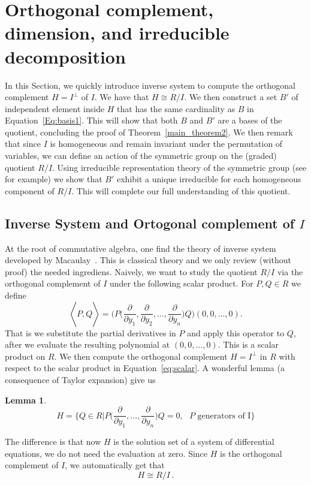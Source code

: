 \documentclass[12pt,reqno]{amsart}
\theoremstyle{plain}
\newtheorem{lemma}[theorem]{Lemma}
\theoremstyle{definition}
\DeclareMathOperator{\la}{\langle}
\DeclareMathOperator{\ra}{\rangle}
\begin{document}
\section{Orthogonal complement, dimension, and irreducible decomposition}\label{sec:irreducible}
In this Section, we quickly introduce inverse system to compute the orthogonal complement $H=I^\perp$ of $I$.
We have that $H\cong R/I$.
We then construct a set $B'$ of independent element inside  $H$ that has the same cardinality as $B$ in Equation~\eqref{Eq:basis1}.
This will show that both $B$ and $B'$ are a bases of the  quotient, concluding the proof of Theorem~\ref{main_theorem2}.
 We then remark that  since $I$ is homogeneous and remain invariant under the permutation of variables, we can define an action of the symmetric group on the (graded) quotient $R/I$. Using  irreducible representation theory of the symmetric group (see \cite{Sagan} for example) we show that $B'$  exhibit a unique irreducible for each homogeneous component of $R/I$. This will complete our full understanding of this quotient.


\subsection{Inverse System and Ortogonal complement of $I$}\label{sec:inverse}
At the root of commutative algebra, one find the theory of inverse system developed by Macaulay~\cite{Macaulay}. This is classical theory and we
only review (without proof) the needed ingrediens.
Naively, we want to study the quotient $R/I$ via the orthogonal complement of $I$ under the following scalar product.
For $P,Q\in R$ we define
 \begin{equation}\label{eq:scalar}
     \la P, Q \ra = \Big( P\big({\textstyle \frac{ \partial}{ \partial y_1},\frac{ \partial}{ \partial y_2},\ldots,\frac{ \partial}{ \partial y_n}}\big) Q\Big)(0,0,\ldots,0).
   \end{equation}
That is we substitute the partial derivatives in $P$ and apply this operator to $Q$, after we evaluate the resulting polynomial at $(0,0,\ldots,0)$.
This is a scalar product on $R$. We then compute the orthogonal complement $H=I^\perp$ in $R$ with respect to the scalar product in Equation~\eqref{eq:scalar}.
A wonderful lemma (a consequence of Taylor expansion) give us
\begin{lemma}\label{lem:ortho}
  $$H = \big\{ Q \in R\big| P\big({\textstyle \frac{ \partial}{ \partial y_1},\ldots,\frac{ \partial}{ \partial y_n}}\big) Q =0, \text{ $P$ generators of I}\big\}$$
  \end{lemma}
 The difference is that now $H$ is the solution set of a system of differential equations, we do not need the evaluation at zero. Since $H$ is the orthogonal complement
 of $I$, we automatically get that
 $$ H \cong R/I\,.$$
 
\end{document}
